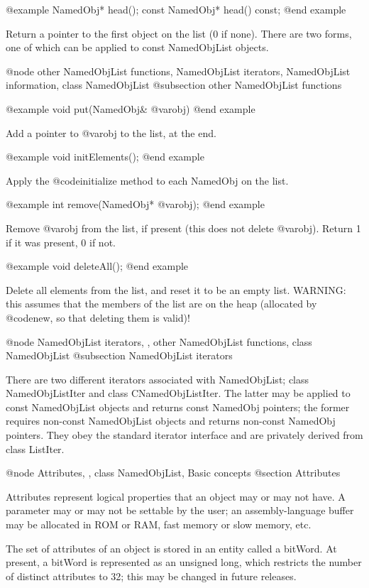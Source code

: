 @example
NamedObj* head();
const NamedObj* head() const;
@end example

Return a pointer to the first object on the list (0 if none).  There
are two forms, one of which can be applied to const NamedObjList objects.

@node other NamedObjList functions, NamedObjList iterators, NamedObjList information, class NamedObjList
@subsection other NamedObjList functions

@example
void put(NamedObj& @var{obj})
@end example

Add a pointer to @var{obj} to the list, at the end.

@example
void initElements();
@end example

Apply the @code{initialize} method to each NamedObj on the list.

@example
int remove(NamedObj* @var{obj});
@end example

Remove @var{obj} from the list, if present (this does not delete
@var{obj}).  Return 1 if it was present, 0 if not.

@example
void deleteAll();
@end example

Delete all elements from the list, and reset it to be an empty list.
WARNING: this assumes that the members of the list are on the heap
(allocated by @code{new}, so that deleting them is valid)!

@node NamedObjList iterators,  , other NamedObjList functions, class NamedObjList
@subsection NamedObjList iterators

There are two different iterators associated with NamedObjList;
class NamedObjListIter and class CNamedObjListIter.  The latter may
be applied to const NamedObjList objects and returns const NamedObj
pointers; the former requires non-const NamedObjList objects and
returns non-const NamedObj pointers.  They obey the standard iterator
interface and are privately derived from class ListIter.

@node Attributes,  , class NamedObjList, Basic concepts
@section Attributes

Attributes represent logical properties that an object may or may
not have.  A parameter may or may not be settable by the user;
an assembly-language buffer may be allocated in ROM or RAM, fast
memory or slow memory, etc.

The set of attributes of an object is stored in an entity called
a bitWord.  At present, a bitWord is represented as an unsigned
long, which restricts the number of distinct attributes to 32;
this may be changed in future releases.

